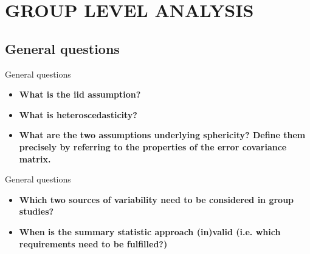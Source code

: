 \documentclass{beamer}
\begin{document}
\section{GROUP LEVEL ANALYSIS}    
 
\subsection[General questions]{General questions}

\begin{frame}{General questions}
  \begin{itemize} 
    \item \textbf{What is the iid assumption?}


\bigskip
    \item \textbf{What is heteroscedasticity?}


\bigskip
    \item \textbf{What are the two assumptions underlying sphericity? Define them precisely by referring to the properties of the error covariance matrix.}

  \end{itemize}
\end{frame}


\begin{frame}{General questions}
  \begin{itemize}
    \item \textbf{Which two sources of variability need to be considered in group studies?}
    

\bigskip
    \item \textbf{When is the summary statistic approach (in)valid (i.e. which requirements need to be fulfilled?)}

  \end{itemize}
\end{frame}
\end{document}

